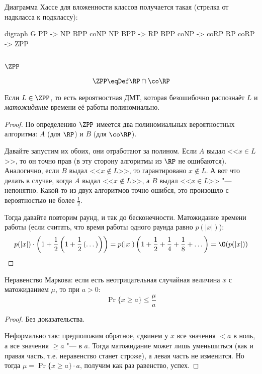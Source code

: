 	\begin{Rem}
		Диаграмма Хассе для вложенности классов получается такая (стрелка от надкласса к подклассу):
		\begin{center}
			\begin{dot2tex}
				digraph G {
					PP -> {NP BPP coNP}
					{NP BPP} -> RP
					{BPP coNP} -> coRP
					{RP coRP} -> ZPP
				}
			\end{dot2tex}
		\end{center}
	\end{Rem}

\subsection[ZPP]{$\ZPP$}
	\begin{Def}
		\[ \ZPP \eqDef \RP \cap \co\RP \]
	\end{Def}
	\begin{theorem}
		Если $L \in \ZPP$, то есть вероятностная ДМТ, которая безошибочно распознаёт $L$ и \textit{матожидание} времени её работы полиномиально.
	\end{theorem}
	\begin{proof}
		По определению $\ZPP$ имеется два полиномиальных вероятностных алгоритма: $A$ (для $\RP$) и $B$ (для $\co\RP$).

		Давайте запустим их обоих, они отработают за полином.
		Если $A$ выдал <<$x \in L$>>, то он точно прав (в эту сторону алгоритмы из $\RP$ не ошибаются).
		Аналогично, если $B$ выдал <<$x \notin L$>>, то гарантировано $x \notin L$.
		А вот что делать в случае, когда $A$ выдал <<$x \notin L$>>, а $B$ выдал <<$x \in L$>> "--- непонятно.
		Какой-то из двух алгоритмов точно ошибся, это произошло с вероятностью не более $\frac 12$.

		Тогда давайте повторим раунд, и так до бесконечности.
		Матожидание времени работы (если считать, что время работы одного раунда равно $p(|x|)$):
		\[ p(|x|) \cdot \left( 1 + \frac 12\left(1 + \frac12\left(\dots \right)\right)\right) = p(|x|) \left(1+\frac12+\frac14+\frac18+\dots\right) = \O(p(|x|)) \]
	\end{proof}
	
	\begin{assertion}
		Неравенство Маркова: если есть неотрицательная случайная величина $x$ с матожиданием $\mu$, то при $a > 0$:
		\[ \Pr\{ x \ge a \} \le \frac{\mu}{a} \]
	\end{assertion}
	\begin{proof}
		Без доказательства.

		Неформально так: предположим обратное, сдвинем у $x$ все значения $<a$ в ноль, а все значения $\ge a$ "--- в $a$.
		Тогда матожидание может лишь уменьшиться (как и правая часть, т.е. неравенство станет строже), а левая часть не изменится.
		Но тогда $\mu = \Pr\{ x \ge a \} \cdot a$, получим как раз равенство, успех.
	\end{proof}

